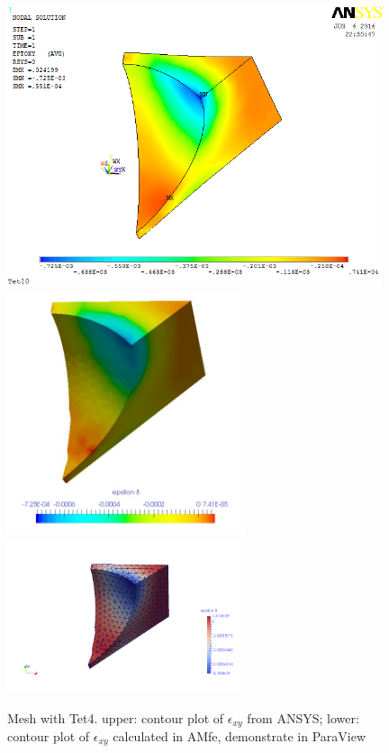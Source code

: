 \begin{figure}[htbp]
	\begin{center}
		\includegraphics[width=11cm,clip]{Tet4Exy.png} 	
		\includegraphics[width=7cm,clip]{Tet4ExyPD.png} 			
		\includegraphics[width=7cm,clip]{Tet4ExyP.png} 		
		\caption{Mesh with Tet4. upper: contour plot of $\epsilon_{xy}$ from ANSYS; lower: contour plot of $\epsilon_{xy}$ calculated in AMfe, demonstrate in ParaView} \label{fig: Tet4Exy}
	\end{center}
\end{figure}
\clearpage 

